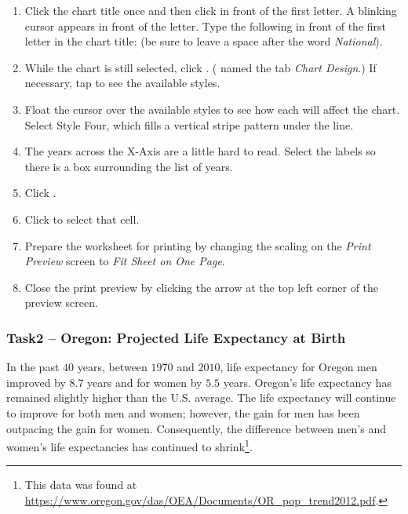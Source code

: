 \begin{enumbox}
\begin{enumerate}
		\item Click the chart title once and then click in front of the first letter. A blinking cursor appears in front of the letter. Type the following in front of the first letter in the chart title:  (be sure to leave a space after the word \textit{National}).
		\item While the chart is still selected, click . ( named the tab \textit{Chart Design}.) If necessary, tap  to see the available styles.
		\item Float the cursor over the available styles to see how each will affect the chart. Select Style Four, which fills a vertical stripe pattern under the line.
		\item The years across the X-Axis are a little hard to read. Select the labels so there is a box surrounding the list of years. 
		\item Click .
		\item Click  to select that cell.
		\item Prepare the  worksheet for printing by changing the scaling on the \textit{Print Preview} screen to \textit{Fit Sheet on One Page}.
		\item Close the print preview by clicking the arrow at the top left corner of the preview screen.
	\end{enumerate}
\end{enumbox}

\subsubsection{Task2 – Oregon: Projected Life Expectancy at Birth}

In the past $ 40 $ years, between $ 1970 $ and $ 2010 $, life expectancy for Oregon men improved by $ 8.7 $ years and for women by $ 5.5 $ years. Oregon's life expectancy has remained slightly higher than the U.S. average. The life expectancy will continue to improve for both men and women; however, the gain for men has been outpacing the gain for women. Consequently, the difference between men's and women's life expectancies has continued to shrink\footnote{This data was found at \url{https://www.oregon.gov/das/OEA/Documents/OR_pop_trend2012.pdf}.}.

